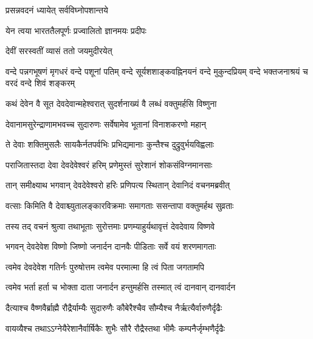 
{प्रसन्नवदनं ध्यायेत् सर्वविघ्नोपशान्तये}

{येन त्वया भारततैलपूर्णः प्रज्वालितो ज्ञानमयः प्रदीपः}%


{देवीं सरस्वतीं व्यासं ततो जयमुदीरयेत्}


{वन्दे पन्नगभूषणं मृगधरं वन्दे पशूनां पतिम्}
{वन्दे सूर्यशशाङ्कवह्निनयनं वन्दे मुकुन्दप्रियम्}
{वन्दे भक्तजनाश्रयं च वरदं वन्दे शिवं शङ्करम्}



\twolineshloka
{कथं देवेन वै सूत देवदेवान्महेश्वरात्}
{सुदर्शनाख्यं वै लब्धं वक्तुमर्हसि विष्णुना} %


\twolineshloka
{देवानामसुरेन्द्राणामभवच्च सुदारुणः}
{सर्वेषामेव भूतानां विनाशकरणो महान्} %

\twolineshloka
{ते देवाः शक्तिमुसलैः सायकैर्नतपर्वभिः}
{प्रभिद्यमानाः कुन्तैश्च दुद्रुवुर्भयविह्वलाः} %

\twolineshloka
{पराजितास्तदा देवा देवदेवेश्वरं हरिम्}
{प्रणेमुस्तं सुरेशानं शोकसंविग्नमानसाः} %

\twolineshloka
{तान् समीक्ष्याथ भगवान् देवदेवेश्वरो हरिः}
{प्रणिपत्य स्थितान् देवानिदं वचनमब्रवीत्} %

\twolineshloka
{वत्साः किमिति वै देवाश्च्युतालङ्कारविक्रमाः}
{समागताः ससन्तापा वक्तुमर्हथ सुव्रताः} %

\twolineshloka
{तस्य तद् वचनं श्रुत्वा तथाभूताः सुरोत्तमाः}
{प्रणम्याहुर्यथावृत्तं देवदेवाय विष्णवे} %

\twolineshloka
{भगवन् देवदेवेश विष्णो जिष्णो जनार्दन}
{दानवैः पीडिताः सर्वे वयं शरणमागताः} %

\twolineshloka
{त्वमेव देवदेवेश गतिर्नः पुरुषोत्तम}
{त्वमेव परमात्मा हि त्वं पिता जगतामपि} %

\twolineshloka
{त्वमेव भर्ता हर्ता च भोक्ता दाता जनार्दन}
{हन्तुमर्हसि तस्मात् त्वं दानवान् दानवार्दन} %

\twolineshloka
{दैत्याश्च वैष्णवैर्ब्राह्मै रौद्रैर्याम्यैः सुदारुणैः}
{कौबेरैश्चैव सौम्यैश्च नैर्ऋत्यैर्वारुणैर्दृढैः} %

\twolineshloka
{वायव्यैश्च तथाऽऽग्नेयैरेशानैर्वार्षिकैः शुभैः}
{सौरै रौद्रैस्तथा भीमैः कम्पनैर्जृम्भणैर्दृढैः} %

